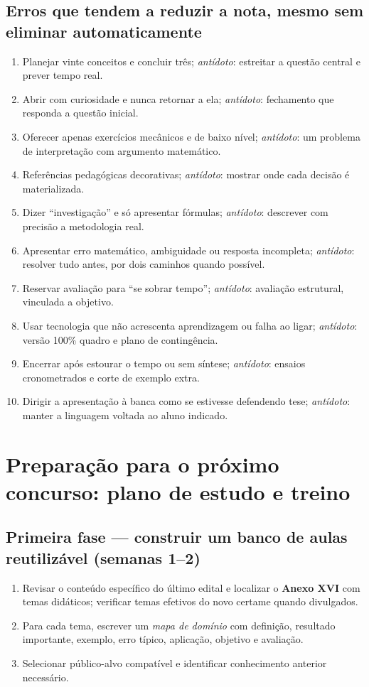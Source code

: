\documentclass[11pt,a4paper]{article}
\begin{document}
\subsection{Erros que tendem a reduzir a nota, mesmo sem eliminar automaticamente}
\begin{enumerate}
\item Planejar vinte conceitos e concluir três; \textit{antídoto}: estreitar a questão central e prever tempo real.
\item Abrir com curiosidade e nunca retornar a ela; \textit{antídoto}: fechamento que responda a questão inicial.
\item Oferecer apenas exercícios mecânicos e de baixo nível; \textit{antídoto}: um problema de interpretação com argumento matemático.
\item Referências pedagógicas decorativas; \textit{antídoto}: mostrar onde cada decisão é materializada.
\item Dizer ``investigação'' e só apresentar fórmulas; \textit{antídoto}: descrever com precisão a metodologia real.
\item Apresentar erro matemático, ambiguidade ou resposta incompleta; \textit{antídoto}: resolver tudo antes, por dois caminhos quando possível.
\item Reservar avaliação para ``se sobrar tempo''; \textit{antídoto}: avaliação estrutural, vinculada a objetivo.
\item Usar tecnologia que não acrescenta aprendizagem ou falha ao ligar; \textit{antídoto}: versão 100\% quadro e plano de contingência.
\item Encerrar após estourar o tempo ou sem síntese; \textit{antídoto}: ensaios cronometrados e corte de exemplo extra.
\item Dirigir a apresentação à banca como se estivesse defendendo tese; \textit{antídoto}: manter a linguagem voltada ao aluno indicado.
\end{enumerate}

\section{Preparação para o próximo concurso: plano de estudo e treino}
\subsection{Primeira fase --- construir um banco de aulas reutilizável (semanas 1--2)}
\begin{enumerate}
\item Revisar o conteúdo específico do último edital e localizar o \textbf{Anexo XVI} com temas didáticos; verificar temas efetivos do novo certame quando divulgados.
\item Para cada tema, escrever um \textit{mapa de domínio} com definição, resultado importante, exemplo, erro típico, aplicação, objetivo e avaliação.
\item Selecionar público-alvo compatível e identificar conhecimento anterior necessário.
\end{enumerate}
\end{document}
